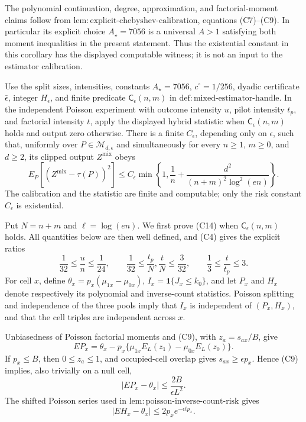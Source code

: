 The polynomial continuation, degree, approximation, and factorial-moment claims follow from \(\mathrm{lem:explicit\mbox{-}chebyshev\mbox{-}calibration}\), equations (C7)--(C9).  In particular its explicit choice \(A_\star=7056\) is a universal \(A>1\) satisfying both moment inequalities in the present statement.  Thus the existential constant in this corollary has the displayed computable witness; it is not an input to the estimator calibration.

Use the split sizes, intensities, constants \(A_\star=7056\), \(c^\circ=1/256\), dyadic certificate \(\bar\epsilon\), integer \(H_\epsilon\), and finite predicate \(\mathsf C_\epsilon(n,m)\) in \(\mathrm{def:mixed\mbox{-}estimator\mbox{-}handle}\).  In the independent Poisson experiment with outcome intensity \(u\), pilot intensity \(t_p\), and factorial intensity \(t\), apply the displayed hybrid statistic when \(\mathsf C_\epsilon(n,m)\) holds and output zero otherwise.  There is a finite \(C_\epsilon\), depending only on \(\epsilon\), such that, uniformly over \(P\in\mathcal M_{d,\epsilon}\) and simultaneously for every \(n\ge1\), \(m\ge0\), and \(d\ge2\), its clipped output \(Z^{\mathrm{mix}}\) obeys
\[
 E_P[(Z^{\mathrm{mix}}-\tau(P))^2]
 \le C_\epsilon\min\!\left\{1,\frac1n+\frac{d^2}{(n+m)^2\log^2(en)}\right\}. \tag{C14}
\]
The calibration and the statistic are finite and computable; only the risk constant \(C_\epsilon\) is existential.

Put \(N=n+m\) and \(\ell=\log(en)\).  We first prove (C14) when \(\mathsf C_\epsilon(n,m)\) holds.  All quantities below are then well defined, and (C4) gives the explicit ratios
\[
 \frac1{32}\le\frac un\le\frac1{24},\qquad
 \frac1{32}\le\frac{t_p}N,\frac tN\le\frac3{32},
 \qquad \frac13\le\frac t{t_p}\le3.                               \tag{C15}
\]
For cell \(x\), define \(\theta_x=p_x(\mu_{1x}-\mu_{0x})\), \(I_x=\mathbf1\{J_x\le k_0\}\), and let \(P_x\) and \(H_x\) denote respectively its polynomial and inverse-count statistics.  Poisson splitting and independence of the three pools imply that \(I_x\) is independent of \((P_x,H_x)\), and that the cell triples are independent across \(x\).

Unbiasedness of Poisson factorial moments and (C9), with \(z_a=s_{ax}/B\), give
\[
 EP_x=\theta_x-p_x\{\mu_{1x}E_L(z_1)-\mu_{0x}E_L(z_0)\}.             \tag{C16}
\]
If \(p_x\le B\), then \(0\le z_a\le1\), and occupied-cell overlap gives \(s_{ax}\ge\epsilon p_x\).  Hence (C9) implies, also trivially on a null cell,
\[
 |EP_x-\theta_x|\le\frac{2B}{\epsilon L^2}.                         \tag{C17}
\]
The shifted Poisson series used in \(\mathrm{lem:poisson\mbox{-}inverse\mbox{-}count\mbox{-}risk}\) gives
\[
 |EH_x-\theta_x|\le2p_xe^{-\epsilon tp_x}.                         \tag{C18}
\]

